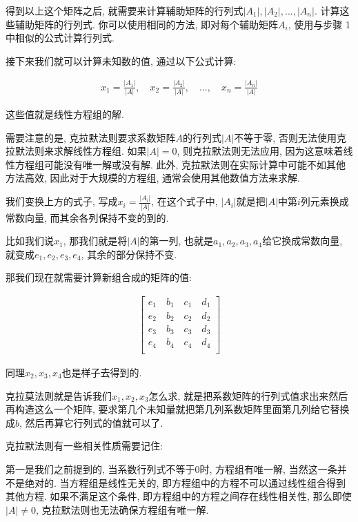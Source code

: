 得到以上这个矩阵之后, 就需要来计算辅助矩阵的行列式$|A_1|, |A_2|,..., |A_n|$. 计算这些辅助矩阵的行列式. 你可以使用相同的方法, 即对每个辅助矩阵$A_i$, 使用与步骤 1 中相似的公式计算行列式. 

接下来我们就可以计算未知数的值, 通过以下公式计算: 

\begin{align*}
  x_1 = \frac{|A_1|}{|A|}, \quad x_2 = \frac{|A_2|}{|A|}, \quad ..., \quad x_n = \frac{|A_n|}{|A|}
\end{align*}

这些值就是线性方程组的解. 

需要注意的是, 克拉默法则要求系数矩阵$A$的行列式$|A|$不等于零, 否则无法使用克拉默法则来求解线性方程组. 如果$|A| = 0$, 则克拉默法则无法应用, 因为这意味着线性方程组可能没有唯一解或没有解. 此外, 克拉默法则在实际计算中可能不如其他方法高效, 因此对于大规模的方程组, 通常会使用其他数值方法来求解. 

我们变换上方的式子, 写成$x_i = \frac{|A_i|}{|A|}$, 在这个式子中, $|A_i|$就是把$|A|$中第$i$列元素换成常数向量, 而其余各列保持不变的到的. 

比如我们说$x_1$, 那我们就是将$|A|$的第一列, 也就是${a_1, a_2, a_3, a_4}$给它换成常数向量, 就变成${e_1, e_2, e_3, e_4}$, 其余的部分保持不变. 

那我们现在就需要计算新组合成的矩阵的值: 

\begin{align*}
  \begin{bmatrix}
  e_1 \quad b_1 \quad c_1 \quad  d_1\\
  e_2 \quad b_2 \quad c_2 \quad  d_2\\ 
  e_3 \quad b_3 \quad c_3 \quad  d_3\\
  e_4 \quad b_4 \quad c_4 \quad  d_4\\
  \end{bmatrix}
\end{align*}


同理$x_2,x_3,x_4$也是样子去得到的. 

克拉莫法则就是告诉我们$x_1,x_2,x_3$怎么求, 就是把系数矩阵的行列式值求出来然后再构造这么一个矩阵, 要求第几个未知量就把第几列系数矩阵里面第几列给它替换成$b$, 然后再算它行列式的值就可以了. 

克拉默法则有一些相关性质需要记住:

第一是我们之前提到的, 当系数行列式不等于$0$时, 方程组有唯一解, 当然这一条并不是绝对的. 当方程组是线性无关的, 即方程组中的方程不可以通过线性组合得到其他方程. 如果不满足这个条件, 即方程组中的方程之间存在线性相关性, 那么即使$|A| \ne 0$, 克拉默法则也无法确保方程组有唯一解. 

